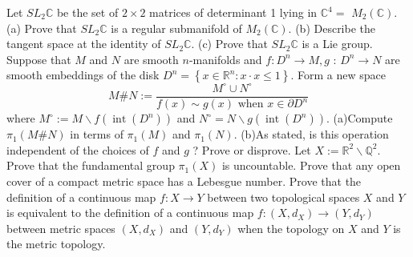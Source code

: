 \documentclass[14pt]{extarticle}
\begin{document}
Let $S L_{2} \mathbb{C}$ be the set of $2 \times 2$ matrices of determinant 1 lying in $\mathbb{C}^{4}=$ $M_{2}(\mathbb{C})$.
(a) Prove that $S L_{2} \mathbb{C}$ is a regular submanifold of $M_{2}(\mathbb{C})$.
(b) Describe the tangent space at the identity of $S L_{2} \mathbb{C}$.
(c) Prove that $S L_{2} \mathbb{C}$ is a Lie group.
\newpage
Suppose that $M$ and $N$ are smooth $n$-manifolds and $f: D^{n} \rightarrow M, g$ : $D^{n} \rightarrow N$ are smooth embeddings of the disk $D^{n}=\left\{x \in \mathbb{R}^{n}: x \cdot x \leq 1\right\}$. Form a new space
$$
M \# N:=\frac{M^{\circ} \cup N^{\circ}}{f(x) \sim g(x) \text { when } x \in \partial D^{n}}
$$
where $M^{\circ}:=M \backslash f\left(\operatorname{int}\left(D^{n}\right)\right)$ and $N^{\circ}=N \backslash g\left(\operatorname{int}\left(D^{n}\right)\right)$.
(a)Compute $\pi_{1}(M \# N)$ in terms of $\pi_{1}(M)$ and $\pi_{1}(N)$.
(b)As stated, is this operation independent of the choices of $f$ and $g$ ? Prove or disprove.
\newpage
Let $X:=\mathbb{R}^{2} \backslash \mathbb{Q}^{2}$. Prove that the fundamental group $\pi_{1}(X)$ is uncountable.
\newpage
Prove that any open cover of a compact metric space has a Lebesgue number.
\newpage
Prove that the definition of a continuous map $f: X \rightarrow Y$ between two topological spaces $X$ and $Y$ is equivalent to the definition of a continuous map $f:\left(X, d_{X}\right) \rightarrow\left(Y, d_{Y}\right)$ between metric spaces $\left(X, d_{X}\right)$ and $\left(Y, d_{Y}\right)$ when the topology on $X$ and $Y$ is the metric topology.
\end{document}
